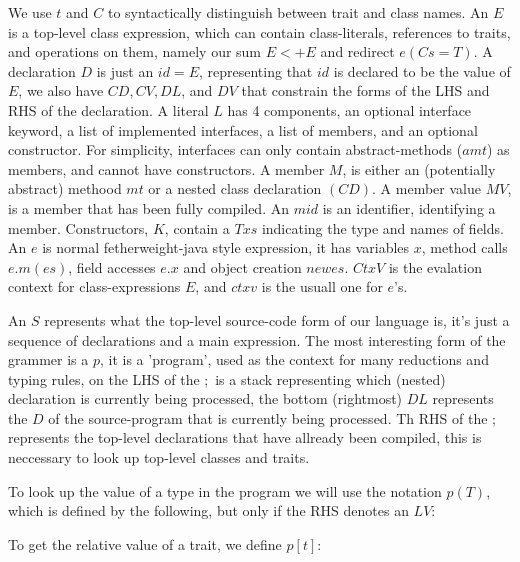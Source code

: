 We use $t$ and $C$ to syntactically distinguish between trait and class names.
An $E$ is a top-level class expression, which can contain class-literals, references to traits, and operations on them, namely our sum $E <+ E$ and redirect $e(Cs=T)$.
A declaration $D$ is just an $id = E$, representing that $id$ is declared to be the value of $E$, we also have $CD, CV, DL$, and $DV$ that constrain the forms of the LHS and RHS of the declaration.
A literal $L$ has 4 components, an optional interface keyword, a list of implemented interfaces, a list of members, and an optional constructor. For simplicity, interfaces can only contain abstract-methods ($amt$) as members, and cannot have  constructors. A member $M$, is either an (potentially abstract) methood $mt$ or a nested class declaration $(CD)$. A member value $MV$, is a member that has been fully compiled. An $mid$ is an identifier, identifying a member.
Constructors, $K$, contain a $Txs$ indicating the type and names of fields. An $e$ is normal fetherweight-java style expression, it has variables $x$, method calls $e.m(es)$, field accesses $e.x$ and object creation $new es$.
$CtxV$ is the evalation context for class-expressions $E$, and $ctxv$ is the usuall one for $e$’s.

An $S$ represents what the top-level source-code form of our language is, it’s just a sequence of declarations and a main expression.
The most interesting form of the grammer is a $p$, it is a ’program’, used as the context for many reductions and typing rules, on the LHS of the $;$ is a stack representing which (nested) declaration is currently being processed, the bottom (rightmost) $DL$ represents the $D$ of the source-program that is currently being processed. Th RHS of the $;$ represents the top-level declarations that have allready been compiled, this is neccessary to look up top-level classes and traits.

\noindent To look up the value of a type in the program we will use the notation $p(T)$, which is defined by the following, but only if the RHS denotes an $LV$:
\begin{defye}%
%
%
%
\end{defye}

\noindent To get the relative value of a trait, we define $p[t]$:
\begin{defye}%
\end{defye}

